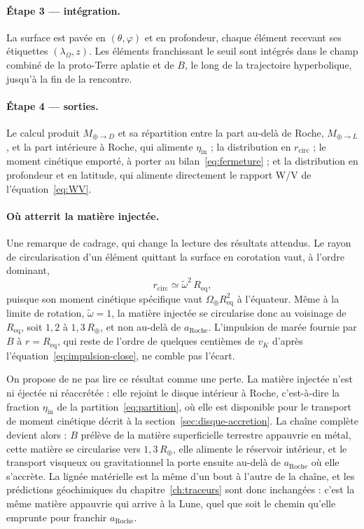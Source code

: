 \documentclass[11pt,a4paper,openany]{report}
\newcommand{\Rt}{R_{\oplus}}
\newcommand{\Req}{R_{\mathrm{eq}}}
\newcommand{\aR}{a_{\mathrm{Roche}}}
\begin{document}
\paragraph{Étape 3 — intégration.} La surface est pavée en $(\theta,\varphi)$ et en profondeur, chaque
élément recevant ses étiquettes $(\lambda_\Omega,z)$. Les éléments franchissant le seuil sont
intégrés dans le champ combiné de la proto-Terre aplatie et de $B$, le long de la trajectoire
hyperbolique, jusqu'à la fin de la rencontre.

\paragraph{Étape 4 — sorties.} Le calcul produit $M_{\oplus\to D}$ et sa répartition entre la part
au-delà de Roche, $M_{\oplus\to L}$, et la part intérieure à Roche, qui alimente
$\eta_{\mathrm{in}}$ ; la distribution en $r_{\mathrm{circ}}$ ; le moment cinétique emporté, à
porter au bilan~\eqref{eq:fermeture} ; et la distribution en profondeur et en latitude, qui alimente
directement le rapport W/V de l'équation~\eqref{eq:WV}.

\paragraph{Où atterrit la matière injectée.} Une remarque de cadrage, qui change la lecture des
résultats attendus. Le rayon de circularisation d'un élément quittant la surface en corotation
vaut, à l'ordre dominant,
\begin{equation}
r_{\mathrm{circ}}\simeq\tilde\omega^2\,\Req,
\label{eq:rcirc-corot}
\end{equation}
puisque son moment cinétique spécifique vaut $\Omega_\oplus\Req^2$ à l'équateur. Même à la limite
de rotation, $\tilde\omega=1$, la matière injectée se circularise donc au voisinage de $\Req$, soit
$1{,}2$ à $1{,}3\,\Rt$, et non au-delà de $\aR$. L'impulsion de marée fournie par $B$ à $r=\Req$,
qui reste de l'ordre de quelques centièmes de $v_K$ d'après l'équation~\eqref{eq:impulsion-close},
ne comble pas l'écart.

On propose de ne pas lire ce résultat comme une perte. La matière injectée n'est ni éjectée ni
réaccrétée : elle rejoint le disque intérieur à Roche, c'est-à-dire la fraction
$\eta_{\mathrm{in}}$ de la partition~\eqref{eq:partition}, où elle est disponible pour le transport
de moment cinétique décrit à la section~\ref{sec:disque-accretion}. La chaîne complète devient
alors : $B$ prélève de la matière superficielle terrestre appauvrie en métal, cette matière se
circularise vers $1{,}3\,\Rt$, elle alimente le réservoir intérieur, et le transport visqueux ou
gravitationnel la porte ensuite au-delà de $\aR$ où elle s'accrète. La lignée matérielle est la
même d'un bout à l'autre de la chaîne, et les prédictions géochimiques du
chapitre~\ref{ch:traceurs} sont donc inchangées : c'est la même matière appauvrie qui arrive à la
Lune, quel que soit le chemin qu'elle emprunte pour franchir $\aR$.
\end{document}
